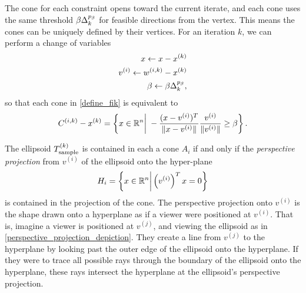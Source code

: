 






The cone for each constraint opens toward the current iterate,
and each cone uses the same threshold $\beta \Delta_k^{p_\beta}$ for feasible directions from the vertex.
This means the cones can be uniquely defined by their vertices.
For an iteration $k$, we can perform a change of variables
\begin{align}
x \gets x - x^{(k)} \\
v^{(i)}  \gets {w^{(i, k)}} - x^{(k)} \\
\beta \gets \beta \Delta_k^{p_{\beta}},
\end{align}
so that each cone in \cref{define_fik} is equivalent to
\begin{align*}
{C^{(i, k)}} - x^{(k)} = \left\{x\in\mathbb R^n\bigg|\;-\frac{(x - v^{(i)})^T}{\|x - v^{(i)}\|} \frac{v^{(i)}}{\|v^{(i)}\|} \ge \beta \right\}.
\end{align*}

The ellipsoid ${T_{\text{sample}}^{(k)}}$ is contained in each a cone $A_i$ if and only if the \emph{perspective projection} from $v^{(i)}$ of the ellipsoid onto the hyper-plane 
\begin{align*}
H_i = \left\{x \in \mathbb R^n \bigg|\left(v^{(i)}\right)^Tx = 0\right\}
\end{align*}
is contained in the projection of the cone.
The perspective projection onto $v^{(i)}$ is the shape drawn onto a hyperplane as if a viewer were positioned at $v^{(i)}$.
That is, imagine a viewer is positioned at $v^{(j)}$, and viewing the ellipsoid as in \cref{perspective_projection_depiction}.
They create a line from $v^{(j)}$ to the hyperplane by looking past the outer edge of the ellipsoid onto the hyperplane.
If they were to trace all possible rays through the boundary of the ellipsoid onto the hyperplane, 
these rays intersect the hyperplane at the ellipsoid's perspective projection.



